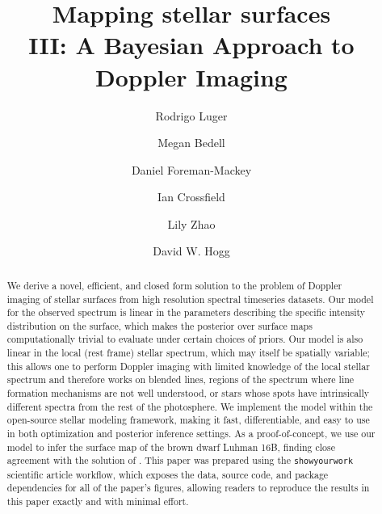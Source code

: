 \documentclass[modern]{aastex631}
\begin{document}
\title{%
    Mapping stellar surfaces\\
    III: A Bayesian Approach to Doppler Imaging
}

\author[0000-0002-0296-3826]{Rodrigo Luger}
%
\author[0000-0001-9907-7742]{Megan Bedell}
%
\author[0000-0002-9328-5652]{Daniel Foreman-Mackey}
%
\author[0000-0002-1835-1891]{Ian Crossfield}
%
\author[0000-0002-3852-3590]{Lily Zhao}
%
\author[0000-0003-2866-9403]{David W. Hogg}

\begin{abstract}
    We derive a novel, efficient, and closed form solution to the problem of Doppler imaging of stellar surfaces from high resolution spectral timeseries datasets.
    Our model for the observed spectrum is linear in the parameters describing the specific intensity distribution on the surface, which makes the posterior over surface maps computationally trivial to evaluate under certain choices of priors.
    Our model is also linear in the local (rest frame) stellar spectrum, which may itself be spatially variable; this allows one to perform Doppler imaging with limited knowledge of the local stellar spectrum and therefore works on blended lines, regions of the spectrum where line formation mechanisms are not well understood, or stars whose spots have intrinsically different spectra from the rest of the photosphere.
    We implement the model within the open-source \starry stellar modeling framework, making it fast, differentiable, and easy to use in both optimization and posterior inference settings.
    As a proof-of-concept, we use our model to infer the surface map of the brown dwarf Luhman 16B, finding close agreement with the solution of \citet{Crossfield2014}.
    This paper was prepared using the \texttt{showyourwork} scientific article workflow, which exposes the data, source code, and package dependencies for all of the paper's figures, allowing readers to reproduce the results in this paper exactly and with minimal effort.
\end{abstract}
\end{document}

